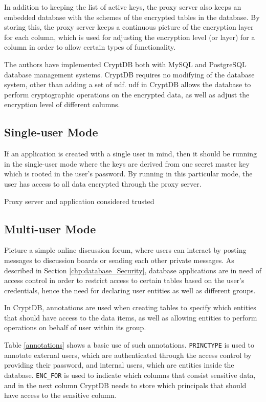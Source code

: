 In addition to keeping the list of active keys, the proxy server also keeps an embedded database with the schemes of the encrypted tables in the database. By storing this, the proxy server keeps a continuous picture of the encryption layer for each column, which is used for adjusting the encryption level (or layer) for a column in order to allow certain types of functionality.

The authors \citep{CryptDB_Main_Paper} have implemented CryptDB both with MySQL and PostgreSQL database management systems. CryptDB requires no modifying of the database system, other than adding a set of \Gls{udf}. \Gls{udf} in CryptDB allows the database to perform cryptographic operations on the encrypted data, as well as adjust the encryption level of different columns.

\subsection{Single-user Mode}
If an application is created with a single user in mind, then it should be running in the single-user mode where the keys are derived from one secret master key which is rooted in the user's password. By running in this particular mode, the user has access to all data encrypted through the proxy server.

Proxy server and application considered trusted
\subsection{Multi-user Mode}

Picture a simple online discussion forum, where users can interact by posting messages to discussion boards or sending each other private messages. As described in Section \ref{chp:database_Security}, database applications are in need of access control in order to restrict access to certain tables based on the user's credentials, hence the need for declaring user entities as well as different groups.

In CryptDB, annotations are used when creating tables to specify which entities that should have access to the data items, as well as allowing entities to perform operations on behalf of user within its group.


Table \ref{annotations} shows a basic use of such annotations. \verb!PRINCTYPE! is used to annotate external users, which are authenticated through the access control by providing their password, and internal users, which are entities inside the database. \verb!ENC_FOR! is used to indicate which columns that consist sensitive data, and in the next column CryptDB needs to store which principals that should have access to the sensitive column.

